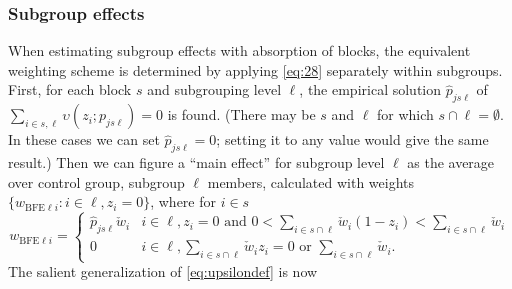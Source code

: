 \documentclass{article}
\newcommand{\owt}[1][{[z_{i}]}]{\ensuremath{\check{w}_{i#1}}}
\newcommand{\absorbInterceptsEF}{\upsilon}
\begin{document}
\subsubsection{Subgroup effects}
When estimating subgroup effects with absorption of blocks,
the equivalent weighting scheme is determined by applying
\eqref{eq:28} separately within subgroups.  First, for each block $s$
and subgrouping level $\ell$, the empirical solution
$\hat{p}_{js\ell}$  of $\sum_{i \in s, \ell}
\absorbInterceptsEF (z_{i}; p_{js\ell})=0$ is found.
(There may be $s$ and $\ell$ for which $s \cap \ell = \emptyset$. In
these cases we can set $\hat{p}_{js\ell}=0$; setting it to any value
would give the same result.)  Then we can figure a ``main effect'' for
subgroup level $\ell$ as the average over control group, subgroup
$\ell$ members, calculated with weights $\{w_{\text{BFE} \ell i}: i
\in \ell, z_{i}=0\}$, where for $i \in s$ 
\begin{equation*}
  w_{\text{BFE} \ell i} =
  \begin{cases}
    \hat{p}_{js\ell} \owt[] & i \in \ell, z_i =0 \text{ and } 0 < \sum_{i
  \in s\cap \ell} \owt[] (1-z_{i})< \sum_{i \in s\cap \ell} \owt[]\\
0 &  i \in \ell, \sum_{i \in s\cap \ell} \owt[] z_{i} = 0 \text{ or }
  \sum_{i \in s\cap \ell} \owt[].
  \end{cases}
\end{equation*}
The salient generalization of \eqref{eq:upsilondef} is now
\end{document}
